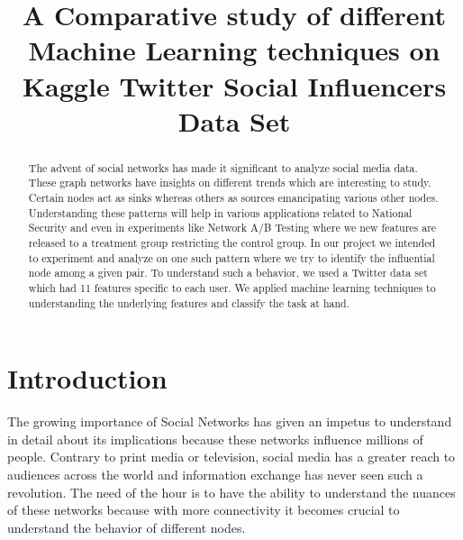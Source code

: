 \documentclass[conference]{IEEEtran}
\numberwithin{equation}{section}
\numberwithin{figure}{section}
\numberwithin{table}{section}
\begin{document}
\title{A Comparative study of different Machine Learning techniques on Kaggle Twitter Social Influencers Data Set}
\author{
}\maketitle


\begin{abstract}
The advent of social networks has made it significant to analyze social media data. These graph networks have insights on different trends which are interesting to study. Certain nodes act as sinks whereas others as sources emancipating various other nodes. Understanding these patterns will help in various applications related to National Security and even in experiments like Network A/B Testing where we new features are released to a treatment group restricting the control group. In our project we intended to experiment and analyze on one such pattern where we try to identify the influential node among a given pair. To understand such a behavior, we used a Twitter data set which had 11 features specific to each user. We applied machine learning techniques to understanding the underlying features and classify the task at hand. 
 
\end{abstract}

\section{Introduction}
The growing importance of Social Networks has given an impetus to understand in detail about its implications because these networks influence millions of people. Contrary to print media or television, social media has a greater reach to audiences across the world and information exchange has never seen such a revolution. The need of the hour is to have the ability to understand the nuances of these networks because with more connectivity it becomes crucial to understand the behavior of different nodes.
\end{document}
